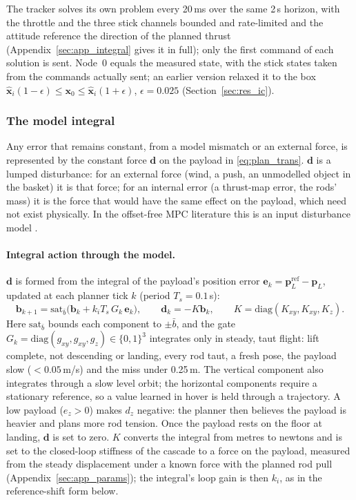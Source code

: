 The tracker solves its own problem every 20\,ms over the same 2\,s horizon, with the throttle and the three stick
channels bounded and rate-limited and the attitude reference the direction of the planned thrust
(Appendix~\ref{sec:app_integral} gives it in full); only the first command of each solution is sent. Node~0 equals the
measured state, with the stick states taken from the commands actually sent; an earlier version relaxed it to the box
$\hat{\mathbf{x}}_i(1-\epsilon) \le \mathbf{x}_0 \le \hat{\mathbf{x}}_i(1+\epsilon)$, $\epsilon = 0.025$
(Section~\ref{sec:res_ic}).

\subsubsection{The model integral}
\label{sec:disturbance}

Any error that remains constant, from a model mismatch or an external force, is represented by the
constant force $\mathbf{d}$ on the payload in \eqref{eq:plan_trans}. $\mathbf{d}$ is a lumped disturbance:
for an external force (wind, a push, an unmodelled object in the basket) it is that force; for an
internal error (a thrust-map error, the rods' mass) it is the force that would have the same effect on
the payload, which need not exist physically. In the offset-free MPC literature this is an input
disturbance model \cite{pannocchia2003disturbance, maeder2009linear}.

\paragraph{Integral action through the model.} $\mathbf{d}$ is formed from the integral of the payload's
position error $\mathbf{e}_k = \mathbf{p}_L^{\mathrm{ref}} - \mathbf{p}_L$, updated at each planner tick
$k$ (period $T_s = 0.1$\,s):
\begin{equation}
    \mathbf{b}_{k+1} = \mathrm{sat}_{\bar{b}}\!\big(\mathbf{b}_k + k_i T_s\, G_k\, \mathbf{e}_k\big), \qquad
    \mathbf{d}_k = -K \mathbf{b}_k, \qquad K = \mathrm{diag}(K_{xy}, K_{xy}, K_z).
    \label{eq:lumped_int}
\end{equation}
Here $\mathrm{sat}_{\bar{b}}$ bounds each component to $\pm\bar{b}$, and the gate $G_k = \mathrm{diag}(g_{xy},
g_{xy}, g_z) \in \{0,1\}^3$ integrates only in steady, taut flight: lift complete, not descending or
landing, every rod taut, a fresh pose, the payload slow ($<0.05$\,m/s) and the miss under 0.25\,m. The
vertical component also integrates through a slow level orbit; the horizontal components require a
stationary reference, so a value learned in hover is held through a trajectory. A low payload ($e_z > 0$)
makes $d_z$ negative: the planner then believes the payload is heavier and plans more rod tension. Once
the payload rests on the floor at landing, $\mathbf{d}$ is set to zero. $K$ converts the integral from
metres to newtons and is set to the closed-loop stiffness of the cascade to a force on the payload,
measured from the steady displacement under a known force with the planned rod pull (Appendix~\ref{sec:app_params});
the integral's loop gain is then $k_i$, as in the reference-shift form below.

